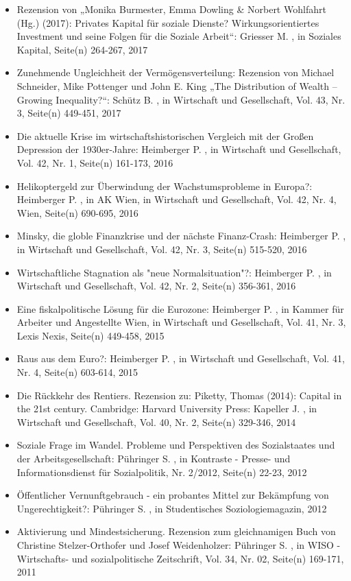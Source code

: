 \begin{itemize}
\item Rezension von „Monika Burmester, Emma Dowling & Norbert Wohlfahrt (Hg.) (2017): Privates Kapital für soziale Dienste? Wirkungsorientiertes Investment und seine Folgen für die Soziale Arbeit“: Griesser M. , in Soziales Kapital, Seite(n) 264-267, 2017
\item Zunehmende Ungleichheit der Vermögensverteilung: Rezension von Michael Schneider, Mike Pottenger und John E. King „The Distribution of Wealth – Growing Inequality?“: Schütz B. , in Wirtschaft und Gesellschaft, Vol. 43, Nr. 3, Seite(n) 449-451, 2017
\item Die aktuelle Krise im wirtschaftshistorischen Vergleich mit der Großen Depression der 1930er-Jahre: Heimberger P. , in Wirtschaft und Gesellschaft, Vol. 42, Nr. 1, Seite(n) 161-173, 2016
\item Helikoptergeld zur Überwindung der Wachstumsprobleme in Europa?: Heimberger P. , in AK Wien, in Wirtschaft und Gesellschaft, Vol. 42, Nr. 4, Wien, Seite(n) 690-695, 2016
\item Minsky, die globle Finanzkrise und der nächste Finanz-Crash: Heimberger P. , in Wirtschaft und Gesellschaft, Vol. 42, Nr. 3, Seite(n) 515-520, 2016
\item Wirtschaftliche Stagnation als "neue Normalsituation"?: Heimberger P. , in Wirtschaft und Gesellschaft, Vol. 42, Nr. 2, Seite(n) 356-361, 2016
\item Eine fiskalpolitische Lösung für die Eurozone: Heimberger P. , in Kammer für Arbeiter und Angestellte Wien, in Wirtschaft und Gesellschaft, Vol. 41, Nr. 3, Lexis Nexis, Seite(n) 449-458, 2015
\item Raus aus dem Euro?: Heimberger P. , in Wirtschaft und Gesellschaft, Vol. 41, Nr. 4, Seite(n) 603-614, 2015
\item Die Rückkehr des Rentiers. Rezension zu: Piketty, Thomas (2014): Capital in the 21st century. Cambridge: Harvard University Press: Kapeller J. , in Wirtschaft und Gesellschaft, Vol. 40, Nr. 2, Seite(n) 329-346, 2014
\item Soziale Frage im Wandel. Probleme und Perspektiven des Sozialstaates und der Arbeitsgesellschaft: Pühringer S. , in Kontraste - Presse- und Informationsdienst für Sozialpolitik, Nr. 2/2012, Seite(n) 22-23, 2012
\item Öffentlicher Vernunftgebrauch - ein probantes Mittel zur Bekämpfung von Ungerechtigkeit?: Pühringer S. , in Studentisches Soziologiemagazin, 2012
\item Aktivierung und Mindestsicherung. Rezension zum gleichnamigen Buch von Christine Stelzer-Orthofer und Josef Weidenholzer: Pühringer S. , in WISO - Wirtschafts- und sozialpolitische Zeitschrift, Vol. 34, Nr. 02, Seite(n) 169-171, 2011

\end{itemize}
